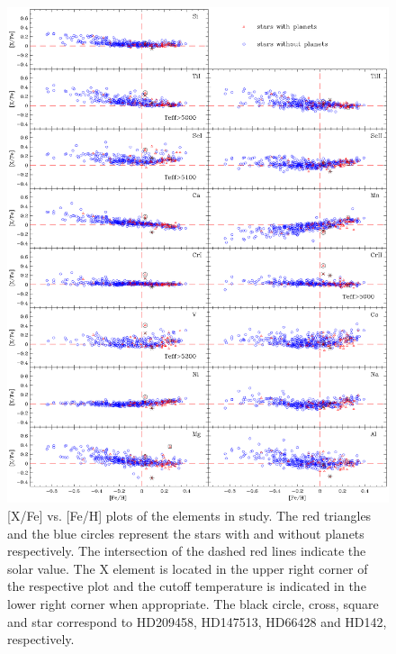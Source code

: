 \documentclass[dvips,12pt,a4paper]{report}
\begin{document}
{{%
\begin{figure}[h!]
\centering
\includegraphics[trim=0cm 2cm 0cm 1cm,clip,width=15 cm]{pics/parte4/xfefehfinal/xfefehtfinal.eps}
\caption[abundance gfx]{[X/Fe] vs. [Fe/H] plots of the elements in study. The red triangles and the blue circles represent the stars with and without planets respectively. The intersection of the dashed red lines indicate the solar value. The X element is located in the upper right corner of the respective plot and the cutoff temperature is indicated in the lower right corner when appropriate. The black circle, cross, square and star correspond to HD209458, HD147513, HD66428 and HD142, respectively.}
\label{xfefeh1}
\end{figure}

}}
\end{document}
